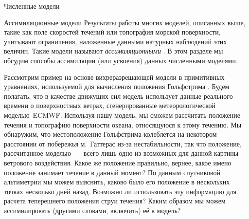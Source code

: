 \begin{chapter}{Численные модели}
\begin{section}{Ассимиляционные модели}\label{sec:AssimModels}
Результаты работы многих моделей, описанных выше, такие как поле скоростей
течений или топография морской поверхности, учитывают ограничения, наложенные
данными натурных наблюдений этих величин. Такие модели называют
\emph{ассимиляционными}%
. В этом разделе мы обсудим способы ассимиляции
(или усвоения) данных численными моделями.
%

Рассмотрим пример на основе вихреразрешающей модели в примитивных уравнениях,
используемой для вычисления положения Гольфстрима%
. Будем полагать, что в качестве движущих сил
модель использует данные реального времени о поверхностных ветрах, 
сгенерированные метеорологической моделью~ECMWF. Используя нашу модель, 
мы сможем рассчитать положение течения и топографию поверхности океана,
относящуюся к этому течению. Мы обнаружим, что местоположение
Гольфстрима колеблется на некотором расстоянии 
от побережья м.~Гаттерас из-за нестабильности, так что положение, 
рассчитанное моделью~--- всего лишь одно из возможных для данной 
картины ветрового воздействия. Какое же положение правильно, вернее, 
какое имено положение занимает течение в данный момент? 
По данным спутниковой альтиметрии мы можем выяснить, каково было его положение 
в нескольких точках несколько дней назад. Возможно ли использовать эту 
информацию для расчета теперешнего положения струи течения? 
Каким образом мы можем ассимилировать (другими словами, включить) её 
в модель?
%


\end{section}
\end{chapter}

